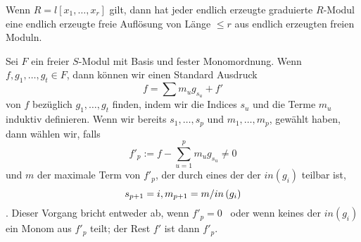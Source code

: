 \documentclass{article}
\begin{document}
\maketitle
\begin{thm}
	Wenn 
	\( R = l \left[ x_1,\dots,x_r \right] \)
	gilt,
	dann hat jeder endlich erzeugte graduierte 
	\(R \)-Modul 
	eine endlich erzeugte freie Aufl\"osung von L\"ange 
	\( \le r \) 
	aus endlich erzeugten freien Moduln.
\end{thm}

\begin{algo}
	Sei 
	\( F \)
	ein freier 
	\( S\)-Modul
	mit Basis und fester Monomordnung.
	Wenn
	\( f,g_1,\dots,g_t \in F \),
	dann k\"onnen wir einen Standard Ausdruck
	\[
	        f=\sum m_u g_{s_u} +f'
	\]
	von
	\( f \)
	bez\"uglich 
	\( g_1,\dots,g_t \)
	finden,
	indem wir die Indices
	\( s_{u} \)
	und die Terme
	\(m_{u} \)
	induktiv definieren.
	Wenn wir bereits 
	\( s_1,\dots,s_p \)
	und
	\( m_1,\dots,m_p\),
	gew\"ahlt haben,
	dann w\"ahlen wir, 
	falls 
	\[
		f'_p:=f-\sum_{u=1}^{p} m_u g_{s_u} \neq 0
	\]
	und
	\( m \) 
	der maximale Term von 
	\(f'_p \),
	der durch eines der der
	\( in\left( g_i \right) \)
	teilbar ist,
	\[
		s_{p+1}=i , \\
		m_{p+1}=m / in\left( g_i \right)
	\].
	Dieser Vorgang bricht entweder ab, wenn 
	\( f'_p=0 \) \
	oder wenn keines der
	\( in\left( g_i \right) \) 
	ein Monom aus 
	\( f'_p\)
	teilt;
	der Rest 
	\(f'\) 
	ist dann 
	\( f'_p \).
\end{algo}
\end{document}

